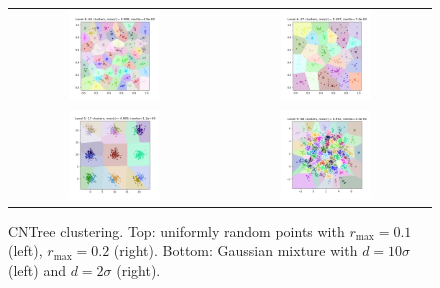 \documentclass[11pt]{article}
\newcommand{\rmax}{r_{\text{max}}}
\begin{document}
\begin{figure}[htbp]
	\begin{center}
	\begin{tabular}{cc}
        \includegraphics[width=0.45\textwidth]{clustering_uniform_200_r_01} &
        \includegraphics[width=0.45\textwidth]{clustering_uniform_200_r_02}
        \\
        \includegraphics[width=0.45\textwidth]{clustering_gaussian_mixture_d_10} &
        \includegraphics[width=0.45\textwidth]{clustering_gaussian_mixture_d_2}
    \end{tabular}
    \end{center}
	\label{models}
	\caption{CNTree clustering. Top: uniformly random points with $\rmax=0.1$ (left), $\rmax=0.2$ (right). Bottom: Gaussian mixture with $d=10 \sigma$ (left) and $d = 2\sigma$ (right).}
\end{figure}
\end{document}
